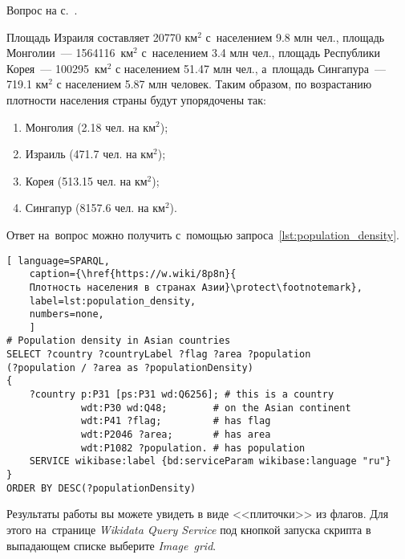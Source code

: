 \begin{task}
    \label{answer:population_density}
    \AnswerBackref Вопрос на с.~\pageref{lst:without_inception}.

    Площадь Израиля составляет \num{20770} км$^2$ с~населением \num{9.8} млн чел., 
    площадь Монголии~--- \num{1564116}~км$^2$ с~населением \num{3.4} млн чел., 
    площадь Республики Корея~--- \num{100295}~км$^2$ с населением \num{51.47} млн чел., 
    а~площадь Сингапура~--- \num{719.1} км$^2$ с населением \num{5.87} млн человек. 
    Таким образом, по возрастанию плотности населения страны будут упорядочены так:
		\begin{enumerate}
            \item Монголия (\num{2.18} чел. на км$^2$);
			\item Израиль (\num{471.7} чел. на км$^2$);
			\item Корея (\num{513.15} чел. на км$^2$);
			\item Сингапур (\num{8157.6} чел. на км$^2$).
		\end{enumerate}

\noindent
Ответ на~вопрос можно получить с~помощью запроса~\ref{lst:population_density}.
	
	\begin{lstlisting}[ language=SPARQL, 
	caption={\href{https://w.wiki/8p8n}{
	Плотность населения в странах Азии}\protect\footnotemark},
	label=lst:population_density,
    numbers=none,
	]
# Population density in Asian countries
SELECT ?country ?countryLabel ?flag ?area ?population 
(?population / ?area as ?populationDensity)
{
    ?country p:P31 [ps:P31 wd:Q6256]; # this is a country
             wdt:P30 wd:Q48;        # on the Asian continent 
             wdt:P41 ?flag;         # has flag
             wdt:P2046 ?area;       # has area
             wdt:P1082 ?population. # has population
	SERVICE wikibase:label {bd:serviceParam wikibase:language "ru"}
}
ORDER BY DESC(?populationDensity)
\end{lstlisting}

Результаты работы вы можете увидеть в виде <<плиточки>> из флагов. 
Для этого на~странице \emph{Wikidata Query Service} под кнопкой запуска скрипта 
в выпадающем списке выберите  \emph{Image~grid}.
\end{task}



